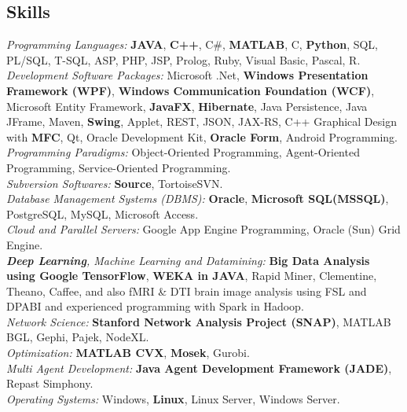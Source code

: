 \documentclass[letter]{res}
\begin{document}
\begin{resume}
		
		\section{Skills}
		\textit{Programming Languages: }\textbf{JAVA}, \textbf{C++}, C\#, \textbf{MATLAB}, C, \textbf{Python}, SQL, PL/SQL, T-SQL, ASP, PHP, JSP, Prolog, Ruby, Visual Basic, Pascal, R.\\
		\textit{Development Software Packages: }Microsoft .Net, \textbf{Windows Presentation Framework (WPF)}, \textbf{Windows Communication Foundation (WCF)}, Microsoft Entity Framework, \textbf{JavaFX}, \textbf{Hibernate}, Java Persistence, Java JFrame, Maven, \textbf{Swing}, Applet, REST, JSON, JAX-RS, C++ Graphical Design with \textbf{MFC}, Qt, Oracle Development Kit, \textbf{Oracle Form}, Android Programming.\\
		\textit{Programming Paradigms: }Object-Oriented Programming, Agent-Oriented Programming, Service-Oriented Programming.\\
		\textit{Subversion Softwares: }\textbf{Source}, TortoiseSVN.\\
		\textit{Database Management Systems (DBMS): }\textbf{Oracle}, \textbf{Microsoft SQL(MSSQL)}, PostgreSQL, MySQL, Microsoft Access.\\
		{\sl Cloud and Parallel Servers: }Google App Engine Programming, Oracle (Sun) Grid Engine.\\
		{\sl \textbf{Deep Learning}, Machine Learning and Datamining: }\textbf{Big Data Analysis using Google TensorFlow}, \textbf{WEKA in JAVA}, Rapid Miner, Clementine, Theano, Caffee, and also fMRI \& DTI brain image analysis using FSL and DPABI and experienced programming with Spark in Hadoop.\\
		{\sl Network Science: }\textbf{Stanford Network Analysis Project (SNAP)}, MATLAB BGL, Gephi, Pajek, NodeXL.\\
		{\sl Optimization: }\textbf{MATLAB CVX}, \textbf{Mosek}, Gurobi.\\
		{\sl Multi Agent Development: }\textbf{Java Agent Development Framework (JADE)}, Repast Simphony.\\
		\textit{Operating Systems: }Windows, \textbf{Linux}, Linux Server, Windows Server.
		

\end{resume}
\end{document}
